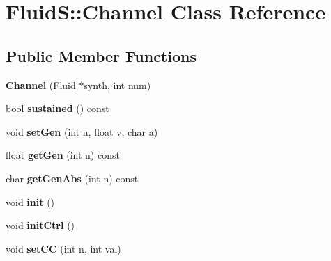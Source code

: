 \hypertarget{class_fluid_s_1_1_channel}{}\section{FluidS\+:\+:Channel Class Reference}
\label{class_fluid_s_1_1_channel}
\subsection*{Public Member Functions}
\begin{DoxyCompactItemize}
\item 
\mbox{\label{class_fluid_s_1_1_channel_acbf26ddcbf1b70609fd3ab2fff9a3d57}} 
{\bfseries Channel} (\hyperlink{class_fluid_s_1_1_fluid}{Fluid} $\ast$synth, int num)
\item 
\mbox{\label{class_fluid_s_1_1_channel_afb6d85344b59765dcd1e0c6369772513}} 
bool {\bfseries sustained} () const
\item 
\mbox{\label{class_fluid_s_1_1_channel_aaa3e230e8b92677a23bc4de5a664ba6e}} 
void {\bfseries set\+Gen} (int n, float v, char a)
\item 
\mbox{\label{class_fluid_s_1_1_channel_a614c9ca4a9fb736b98017e3ffc2cde54}} 
float {\bfseries get\+Gen} (int n) const
\item 
\mbox{\label{class_fluid_s_1_1_channel_a07e524c405984e1d2dd39d3bc2fe3132}} 
char {\bfseries get\+Gen\+Abs} (int n) const
\item 
\mbox{\label{class_fluid_s_1_1_channel_aa9f837b49067a8aa33721c61c2c2eb2e}} 
void {\bfseries init} ()
\item 
\mbox{\label{class_fluid_s_1_1_channel_ae6f63c8c6e41d588fb35df047eddb731}} 
void {\bfseries init\+Ctrl} ()
\item 
\mbox{\label{class_fluid_s_1_1_channel_af0350707be0086707badf0c91b38e4e2}} 
void {\bfseries set\+CC} (int n, int val)
\item 
\mbox{\label{class_fluid_s_1_1_channel_a742eb209a98200f540408066b25b02ca}} 

\end{DoxyCompactItemize}
